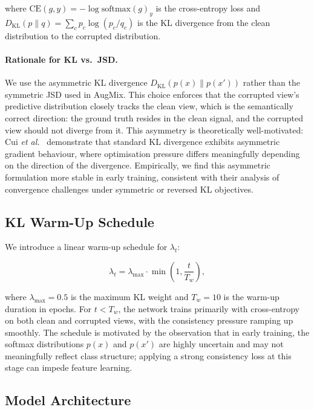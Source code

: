 \documentclass[10pt,twocolumn]{article}
\begin{document}
where $\mathrm{CE}(g, y) = -\log \mathrm{softmax}(g)_y$ is the cross-entropy loss and $D_{\mathrm{KL}}(p \| q) = \sum_c p_c \log(p_c / q_c)$ is the KL divergence from the clean distribution to the corrupted distribution.

\paragraph{Rationale for KL vs.\ JSD.} We use the asymmetric KL divergence $D_{\mathrm{KL}}(p(x) \| p(x'))$ rather than the symmetric JSD used in AugMix. This choice enforces that the corrupted view's predictive distribution closely tracks the clean view, which is the semantically correct direction: the ground truth resides in the clean signal, and the corrupted view should not diverge from it. This asymmetry is theoretically well-motivated: Cui \emph{et al.}~\cite{cui2025gkl} demonstrate that standard KL divergence exhibits asymmetric gradient behaviour, where optimisation pressure differs meaningfully depending on the direction of the divergence. Empirically, we find this asymmetric formulation more stable in early training, consistent with their analysis of convergence challenges under symmetric or reversed KL objectives.

\subsection{KL Warm-Up Schedule}

We introduce a linear warm-up schedule for $\lambda_t$:

\begin{equation}
\lambda_t = \lambda_{\max} \cdot \min\!\left(1, \frac{t}{T_w}\right),
\label{eq:warmup}
\end{equation}

where $\lambda_{\max} = 0.5$ is the maximum KL weight and $T_w = 10$ is the warm-up duration in epochs. For $t < T_w$, the network trains primarily with cross-entropy on both clean and corrupted views, with the consistency pressure ramping up smoothly. The schedule is motivated by the observation that in early training, the softmax distributions $p(x)$ and $p(x')$ are highly uncertain and may not meaningfully reflect class structure; applying a strong consistency loss at this stage can impede feature learning.

\subsection{Model Architecture}
\end{document}
